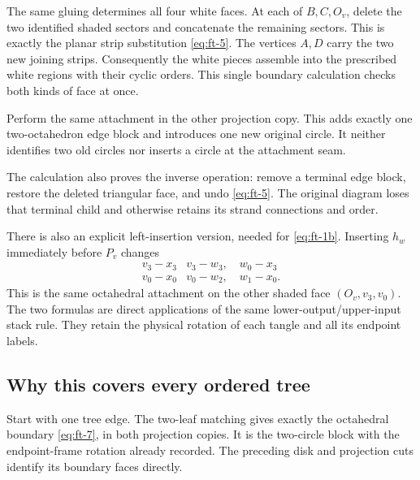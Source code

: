 The same gluing determines all four white faces. At each of
\(B,C,O_v\), delete the two identified shaded sectors and concatenate
the remaining sectors. This is exactly the planar strip substitution
\eqref{eq:ft-5}. The vertices \(A,D\) carry the two new joining strips.
Consequently the white pieces assemble into the prescribed white
regions with their cyclic orders. This single boundary calculation
checks both kinds of face at once.

Perform the same attachment in the other projection copy. This adds exactly one two-octahedron edge block and introduces one new original circle. It neither identifies two old circles nor inserts a circle at the attachment seam.

The calculation also proves the inverse operation: remove a terminal edge block, restore the deleted triangular face, and undo \eqref{eq:ft-5}. The original diagram loses that terminal child and otherwise retains its strand connections and order.

There is also an explicit left-insertion version, needed for \eqref{eq:ft-1b}. Inserting \(h_w\) immediately before \(P_v\) changes
\begin{equation}
\begin{array}{c|c}
 v_3\! -\! x_3&v_3\! -\! w_3,\quad w_0\! -\! x_3\\
 v_0\! -\! x_0&v_0\! -\! w_2,\quad w_1\! -\! x_0.
 \end{array}
\label{eq:ft-7a}
\end{equation}
This is the same octahedral attachment on the other shaded face \((O_v,v_3,v_0)\). The two formulas are direct applications of the same lower-output/upper-input stack rule. They retain the physical rotation of each tangle and all its endpoint labels.

\subsection{Why this covers every ordered tree}\label{sec:ft-4}

Start with one tree edge. The two-leaf matching gives exactly the octahedral boundary \eqref{eq:ft-7}, in both projection copies. It is the two-circle block with the endpoint-frame rotation already
recorded. The preceding disk and projection cuts identify its boundary
faces directly.

